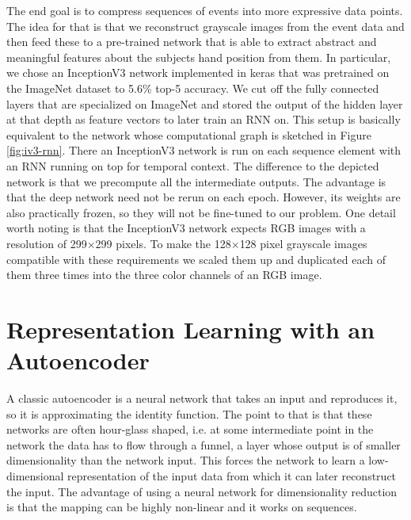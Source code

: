 The end goal is to compress sequences of events into more expressive data
points. The idea for that is that we reconstruct grayscale images from the event
data and then feed these to a pre-trained network that is able to extract
abstract and meaningful features about the subjects hand position from them. In
particular, we chose an InceptionV3 network \cite{inceptionv3} implemented in
keras \cite{chollet2015keras} that was pretrained on the ImageNet dataset to
5.6\% top-5 accuracy. We cut off the fully connected layers that are specialized
on ImageNet and stored the output of the hidden layer at that depth as feature
vectors to later train an RNN on. This setup is basically equivalent to the
network whose computational graph is sketched in Figure \ref{fig:iv3-rnn}. There
an InceptionV3 network is run on each sequence element with an RNN running on
top for temporal context. The difference to the depicted network is that we
precompute all the intermediate outputs. The advantage is that the deep network
need not be rerun on each epoch. However, its weights are also practically
frozen, so they will not be fine-tuned to our problem. One detail worth noting
is that the InceptionV3 network expects RGB images with a resolution of
299$\times$299 pixels. To make the 128$\times$128 pixel grayscale images
compatible with these requirements we scaled them up and duplicated each of them
three times into the three color channels of an RGB image.

\section{Representation Learning with an Autoencoder}
\label{sec:autoencoder}

A classic autoencoder is a neural network that takes an input and reproduces it,
so it is approximating the identity function. The point to that is that these
networks are often hour-glass shaped, i.e. at some intermediate point in the
network the data has to flow through a funnel, a layer whose output is of
smaller dimensionality than the network input. This forces the network to learn
a low-dimensional representation of the input data from which it can later
reconstruct the input. The advantage of using a neural network for
dimensionality reduction is that the mapping can be highly non-linear and it
works on sequences.

